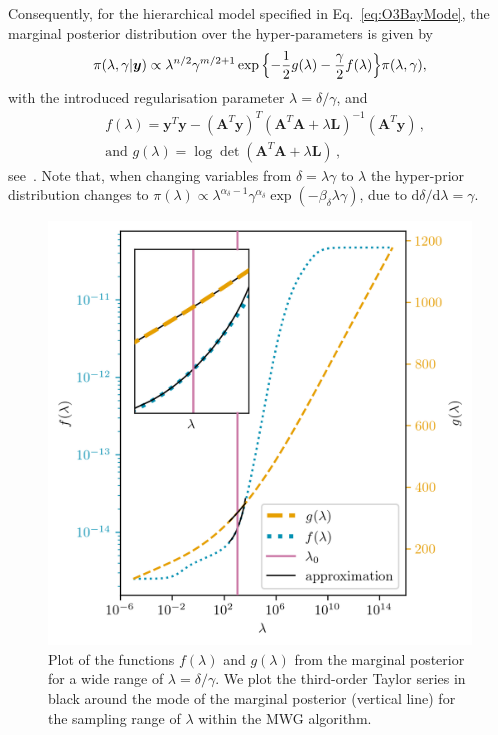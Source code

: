 Consequently, for the hierarchical model specified in Eq.~\ref{eq:O3BayMode}, the marginal posterior distribution over the hyper-parameters is given by
\begin{align}
	\pi(\lambda, \gamma | \bm{y})
	\propto  \lambda^{n/2} \gamma^{m/2 + 1}   \exp{ \Bigl\{ - \frac{1}{2} g ( \lambda) - \frac{\gamma}{2} f ( \lambda) \Bigr\} } \pi(\lambda, \gamma),
	\label{eq:MargPostAppl}
\end{align}
with the introduced regularisation parameter $\lambda = \delta / \gamma$, and
\begin{subequations}
	\label{eq:fandg}
	\begin{align}
		&f ( \lambda) = \bm{y}^T \bm{y} - (\bm{A}^T \bm{y})^T (\bm{A}^T  \bm{A} + \lambda \bm{L})^{-1} (\bm{A}^T \bm{y})  \label{eq:fAppl} \, ,  \\
		&\text{and } g(\lambda) = \log \det (\bm{A}^T  \bm{A} + \lambda \bm{L}) \label{eq:gAppl} \, ,
	\end{align}
\end{subequations}
see~\cite[Lemma 2]{fox2016fast}.
Note that, when changing variables from $\delta = \lambda \gamma$ to $\lambda$ the hyper-prior distribution changes to $\pi(\lambda) \propto \lambda^{\alpha_\delta-1} \gamma^{\alpha_\delta} \exp{(- \beta_\delta \lambda  \gamma)} $, due to $\text{d}\delta / \text{d} \lambda = \gamma$.
\begin{figure}[ht!]
	\centering
	\includegraphics{f_and_g_phd.png}
	\caption[Plot of the functions $f(\lambda)$ and $g(\lambda)$ for marginal posterior.]{Plot of the functions $f(\lambda)$ and $g(\lambda)$ from the marginal posterior for a wide range of $\lambda = \delta / \gamma$. We plot the third-order Taylor series in black around the mode of the marginal posterior (vertical line) for the sampling range of $\lambda$ within the MWG algorithm.}
	\label{fig:fandg}
\end{figure}
